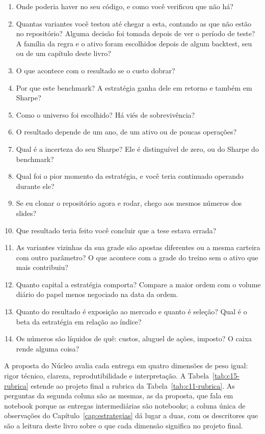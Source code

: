 \begin{enumerate}
  \item Onde poderia haver  no seu código, e como você verificou que não há?
  \item Quantas variantes você testou até chegar a esta, contando as que não estão no repositório? Alguma decisão foi tomada depois de ver o período de teste? A família da regra e o ativo foram escolhidos depois de algum backtest, seu ou de um capítulo deste livro?
  \item O que acontece com o resultado se o custo dobrar?
  \item Por que este benchmark? A estratégia ganha dele em retorno e também em Sharpe?
  \item Como o universo foi escolhido? Há viés de sobrevivência?
  \item O resultado depende de um ano, de um ativo ou de poucas operações?
  \item Qual é a incerteza do seu Sharpe? Ele é distinguível de zero, ou do Sharpe do benchmark?
  \item Qual foi o pior momento da estratégia, e você teria continuado operando durante ele?
  \item Se eu clonar o repositório agora e rodar, chego aos mesmos números dos slides?
  \item Que resultado teria feito você concluir que a tese estava errada?
  \item As variantes vizinhas da sua grade são apostas diferentes ou a mesma carteira com outro parâmetro? O que acontece com a grade do treino sem o ativo que mais contribuiu?
  \item Quanto capital a estratégia comporta? Compare a maior ordem com o volume diário do papel menos negociado na data da ordem.
  \item Quanto do resultado é exposição ao mercado e quanto é seleção? Qual é o beta da estratégia em relação ao índice?
  \item Os números são líquidos de quê: custos, aluguel de ações, imposto? O caixa rende alguma coisa?
\end{enumerate}

A proposta do Núcleo avalia cada entrega em quatro dimensões de peso igual: rigor técnico, clareza, reprodutibilidade e interpretação. A Tabela~\ref{tab:c15-rubrica} estende ao projeto final a rubrica da Tabela~\ref{tab:c11-rubrica}. As perguntas da segunda coluna são as mesmas, as da proposta, que fala em notebook porque as entregas intermediárias são notebooks; a coluna única de observações do Capítulo~\ref{cap:estrategias} dá lugar a duas, com os descritores que são a leitura deste livro sobre o que cada dimensão significa no projeto final.

